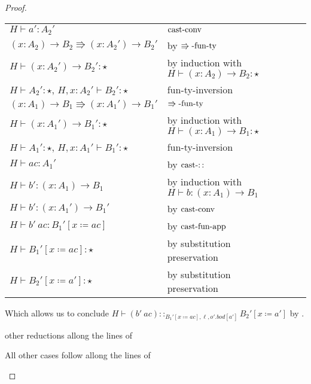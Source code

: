 \begin{proof}
\begin{casenv}
\begin{casenv}
    \begin{tabular}{llll}
      $H\vdash a':A_{2}'$ & $\operatorname{cast-conv}$\tabularnewline
      $\left(x:A_{2}\right)\rightarrow B_{2}\Rrightarrow\left(x:A_{2}'\right)\rightarrow B_{2}'$ & by $\operatorname{\Rrightarrow -fun-ty}$\tabularnewline
      $H\vdash\left(x:A_{2}'\right)\rightarrow B_{2}':\star$ & \makecell[l]{by induction with \\ $H\vdash\left(x:A_{2}\right)\rightarrow B_{2}:\star$} \tabularnewline
      $H\vdash A_{2}':\star$, $H,x:A_{2}'\vdash B_{2}':\star$ & fun-ty-inversion \tabularnewline
      $\left(x:A_{1}\right)\rightarrow B_{1}\Rrightarrow\left(x:A_{1}'\right)\rightarrow B_{1}'$ & $\operatorname{\Rrightarrow -fun-ty}$ \tabularnewline
      $H\vdash\left(x:A_{1}'\right)\rightarrow B_{1}':\star$ & \makecell[l]{by induction with \\ $H\vdash\left(x:A_{1}\right)\rightarrow B_{1}:\star$} \tabularnewline
      $H\vdash A_{1}':\star$, $H,x:A_{1}'\vdash B_{1}':\star$ & fun-ty-inversion\tabularnewline
      $H\vdash ac:A_{1}'$ & by $\operatorname{cast-::}$\tabularnewline
      $H\vdash b':\left(x:A_{1}\right)\rightarrow B_{1}$ & \makecell[l]{by induction with \\ $H\vdash b:\left(x:A_{1}\right)\rightarrow B_{1}$} \tabularnewline
      $H\vdash b':\left(x:A_{1}'\right)\rightarrow B_{1}'$ & by $\operatorname{cast-conv}$\tabularnewline
      $H\vdash b'\ ac:B_{1}'\left[x\coloneqq ac\right]$ & by $\operatorname{cast-fun-app}$\tabularnewline
      $H\vdash B_{1}'\left[x\coloneqq ac\right]:\star$ & by substitution preservation\tabularnewline
      $H\vdash B_{2}'\left[x\coloneqq a'\right]:\star$ & by substitution preservation\tabularnewline
      \end{tabular}
      Which allows us to conclude $H\vdash\left(b'\ ac\right)::_{B_{1}'\left[x\coloneqq ac\right],\ell ,o'.bod[a']}B_{2}'\left[x\coloneqq a'\right]$ by .

    \item other reductions allong the lines of 
  \end{casenv}
  \item All other cases follow allong the lines of 
\end{casenv}


\end{proof}

